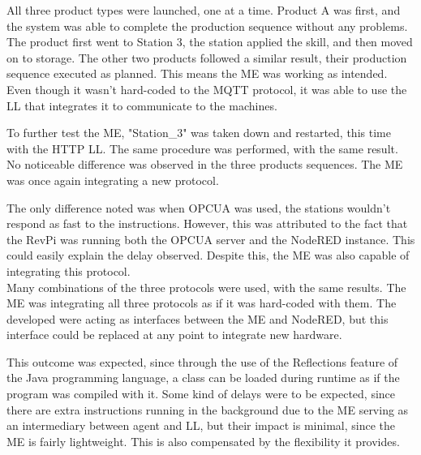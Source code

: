 All three product types were launched, one at a time. Product A was first, and the system was able to complete the production sequence without any problems. The product first went to Station 3, the station applied the skill, and then moved on to storage. The other two products followed a similar result, their production sequence executed as planned. This means the \acrlong{ME} was working as intended. Even though it wasn't hard-coded to the \acrshort{MQTT} protocol, it was able to use the \acrlong{LL} that integrates it to communicate to the machines.

To further test the \acrshort{ME}, "Station\_3" was taken down and restarted, this time with the \acrshort{HTTP} \acrshort{LL}. The same procedure was performed, with the same result. No noticeable difference was observed in the three products sequences. The \acrshort{ME} was once again integrating a new protocol.

The only difference noted was when \acrshort{OPCUA} was used, the stations wouldn't respond as fast to the instructions. However, this was attributed to the fact that the RevPi was running both the \acrshort{OPCUA} server and the NodeRED instance. This could easily explain the delay observed. Despite this, the \acrshort{ME} was also capable of integrating this protocol.\\

Many combinations of the three protocols were used, with the same results. The \acrlong{ME} was integrating all three protocols as if it was hard-coded with them. The  developed were acting as interfaces between the \acrshort{ME} and NodeRED, but this interface could be replaced at any point to integrate new hardware.

This outcome was expected, since through the use of the Reflections feature of the Java programming language, a class can be loaded during runtime as if the program was compiled with it. Some kind of delays were to be expected, since there are extra instructions running in the background due to the \acrlong{ME} serving as an intermediary between agent and \acrlong{LL}, but their impact is minimal, since the \acrshort{ME} is fairly lightweight. This is also compensated by the flexibility it provides.